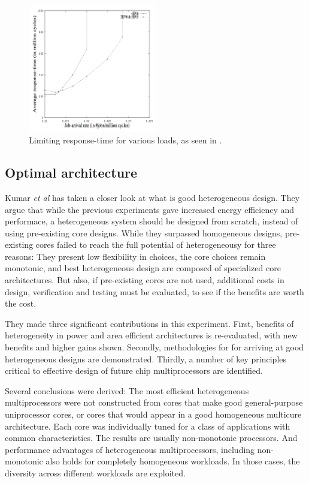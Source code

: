 \begin{figure}[htb]
    \centering
    \includegraphics[width=0.5\textwidth]{Figures/Heterogeneous/Kumar3}
    \caption{Limiting response-time for various loads, as seen in \cite{heterogeneous-perf}.}
    \label{fig:Kumar3}
\end{figure}

\subsection{Optimal architecture}
\label{subsec:rw_arch}
Kumar \textit{et al}\cite{heterogeneous-arch} has taken a closer look at what is good heterogeneous design.
They argue that while the previous experiments gave increased energy efficiency and performace, a heterogeneous system should be designed from scratch, instead of using pre-existing core designs.
While they surpassed homogeneous designs, pre-existing cores failed to reach the full potential of heterogeneousy for three reasons: They present low flexibility in choices, the core choices remain monotonic, and best heterogeneous design are composed of specialized core architectures\cite{heterogeneous-arch}.
But also, if pre-existing cores are not used, additional costs in design, verification and testing must be evaluated, to see if the benefits are worth the cost.

They made three significant contributions in this experiment. 
First, benefits of heterogeneity in power and area efficient architectures is re-evaluated, with new benefits and higher gains shown.
Secondly, methodologies for for arriving at good heterogeneous designs are demonstrated.
Thirdly, a number of key principles critical to effective design of future chip multiprocessors are identified.

Several conclusions were derived:
The most efficient heterogeneous multiprocessors were not constructed from cores that make good general-purpose uniprocessor cores, or cores that would appear in a good homogeneous multicure architecture.
Each core was individually tuned for a class of applications with common characteristics.
The results are usually non-monotonic processors.
And performance advantages of heterogeneous multiprocessors, including non-monotonic also holds for completely homogeneous workloads.
In those cases, the diversity across different workloads are exploited.

